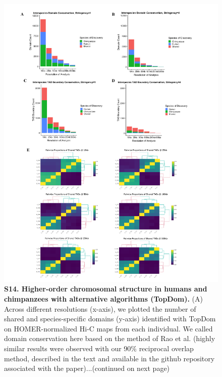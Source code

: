\begin{figure}[!htb]
\label{fig:figS13}
\end{figure}

\begin{figure}[!htb]
\centering
\includegraphics[width=5in]{img/figS14.1.pdf}
\caption[Higher-order chromosomal structure in humans and chimpanzees with alternative algorithms (TopDom).]{\textbf{S14. Higher-order chromosomal structure in humans and chimpanzees with alternative algorithms (TopDom).} (A) Across different resolutions (x-axis), we plotted the number of shared and species-specific domains (y-axis) identified with TopDom \cite{Shin.2016} on HOMER-normalized Hi-C maps from each individual. We called domain conservation here based on the method of Rao et al. \cite{Rao.2014} (highly similar results were observed with our 90\% reciprocal overlap method, described in the text and available in the github repository associated with the paper)...(continued on next page)}
\label{fig:figS14}
\end{figure}

